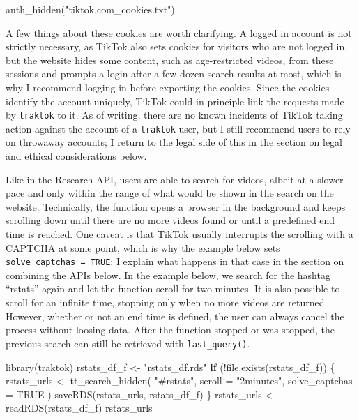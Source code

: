 \documentclass[
  nobib]{ccr}
\newenvironment{Shaded}{\begin{snugshade}}{\end{snugshade}}
\newcommand{\AttributeTok}[1]{\textcolor[rgb]{0.40,0.45,0.13}{#1}}
\newcommand{\ConstantTok}[1]{\textcolor[rgb]{0.56,0.35,0.01}{#1}}
\newcommand{\ControlFlowTok}[1]{\textcolor[rgb]{0.00,0.23,0.31}{\textbf{#1}}}
\newcommand{\FunctionTok}[1]{\textcolor[rgb]{0.28,0.35,0.67}{#1}}
\newcommand{\NormalTok}[1]{\textcolor[rgb]{0.00,0.23,0.31}{#1}}
\newcommand{\OtherTok}[1]{\textcolor[rgb]{0.00,0.23,0.31}{#1}}
\newcommand{\SpecialCharTok}[1]{\textcolor[rgb]{0.37,0.37,0.37}{#1}}
\newcommand{\StringTok}[1]{\textcolor[rgb]{0.13,0.47,0.30}{#1}}
\begin{document}
\begin{Shaded}
\begin{Highlighting}[]
\FunctionTok{auth\_hidden}\NormalTok{(}\StringTok{"tiktok.com\_cookies.txt"}\NormalTok{)}
\end{Highlighting}
\end{Shaded}

A few things about these cookies are worth clarifying. A logged in
account is not strictly necessary, as TikTok also sets cookies for
visitors who are not logged in, but the website hides some content, such
as age-restricted videos, from these sessions and prompts a login after
a few dozen search results at most, which is why I recommend logging in
before exporting the cookies. Since the cookies identify the account
uniquely, TikTok could in principle link the requests made by
\texttt{traktok} to it. As of writing, there are no known incidents of
TikTok taking action against the account of a \texttt{traktok} user, but
I still recommend users to rely on throwaway accounts; I return to the
legal side of this in the section on legal and ethical considerations
below.

Like in the Research API, users are able to search for videos, albeit at
a slower pace and only within the range of what would be shown in the
search on the website. Technically, the function opens a browser in the
background and keeps scrolling down until there are no more videos found
or until a predefined end time is reached. One caveat is that TikTok
usually interrupts the scrolling with a CAPTCHA at some point, which is
why the example below sets \texttt{solve\_captchas\ =\ TRUE}; I explain
what happens in that case in the section on combining the APIs below. In
the example below, we search for the hashtag ``rstats'' again and let
the function scroll for two minutes. It is also possible to scroll for
an infinite time, stopping only when no more videos are returned.
However, whether or not an end time is defined, the user can always
cancel the process without loosing data. After the function stopped or
was stopped, the previous search can still be retrieved with
\texttt{last\_query()}.

\begin{Shaded}
\begin{Highlighting}[]
\FunctionTok{library}\NormalTok{(traktok)}
\NormalTok{rstats\_df\_f }\OtherTok{\textless{}{-}} \StringTok{"rstats\_df.rds"}
\ControlFlowTok{if}\NormalTok{ (}\SpecialCharTok{!}\FunctionTok{file.exists}\NormalTok{(rstats\_df\_f)) \{}
\NormalTok{  rstats\_urls }\OtherTok{\textless{}{-}} \FunctionTok{tt\_search\_hidden}\NormalTok{(}
    \StringTok{"\#rstats"}\NormalTok{,}
    \AttributeTok{scroll =} \StringTok{"2minutes"}\NormalTok{,}
    \AttributeTok{solve\_captchas =} \ConstantTok{TRUE}
\NormalTok{  )}
  \FunctionTok{saveRDS}\NormalTok{(rstats\_urls, rstats\_df\_f)}
\NormalTok{\}}
\NormalTok{rstats\_urls }\OtherTok{\textless{}{-}} \FunctionTok{readRDS}\NormalTok{(rstats\_df\_f)}
\NormalTok{rstats\_urls}
\end{Highlighting}
\end{Shaded}
\end{document}
